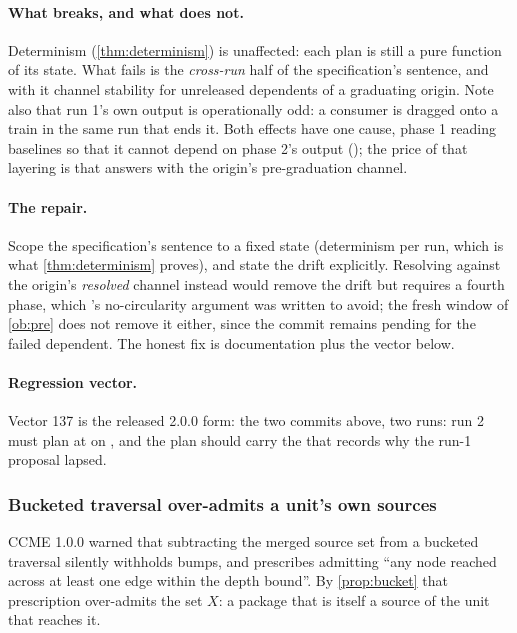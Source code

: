 \paragraph{What breaks, and what does not.} Determinism
(\cref{thm:determinism}) is unaffected: each plan is still a pure function
of its state. What fails is the \emph{cross-run} half of the specification's
sentence, and with it channel stability for unreleased dependents of a
graduating origin. Note also that run 1's own output is operationally odd:
a consumer is dragged onto a train in the same run that ends it. Both
effects have one cause, phase 1 reading baselines so that it cannot depend
on phase 2's output (); the price of that layering is that
 answers with the origin's pre-graduation channel.

\paragraph{The repair.} Scope the specification's sentence to a fixed state
(determinism per run, which is what \cref{thm:determinism} proves), and
state the drift explicitly. Resolving  against the origin's
\emph{resolved} channel instead would remove the drift but requires a
fourth phase, which 's no-circularity argument was written to
avoid; the fresh window of \cref{ob:pre} does not remove it either, since
the commit remains pending for the failed dependent. The honest fix is
documentation plus the vector below.

\paragraph{Regression vector.} Vector 137 is the released 2.0.0 form: the two commits above, two runs: run 2 must
plan  at  on \stable{}, and the plan should carry the
 that records why the run-1 proposal lapsed.

\subsubsection{Bucketed traversal over-admits a unit's own sources}

\begin{obligation}
\label{ob:bucket}
CCME 1.0.0  warned that subtracting the merged source set from a bucketed
traversal silently withholds bumps, and prescribes admitting ``any node reached
across at least one edge within the depth bound''. By \cref{prop:bucket} that
prescription over-admits the set $X$: a package that is itself a source of the
unit that reaches it.
\end{obligation}

